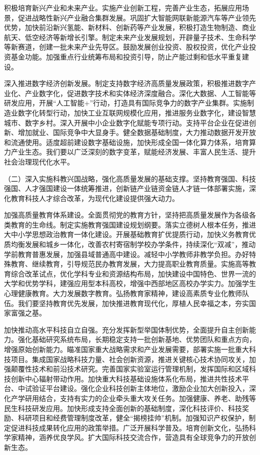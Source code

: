 \documentclass[10pt, UTF8]{ctexbook} %
\begin{document}
积极培育新兴产业和未来产业。实施产业创新工程，完善产业生态，拓展应用场景，促进战略性新兴产业融合集群发展。巩固扩大智能网联新能源汽车等产业领先优势，加快前沿新兴氢能、新材料、创新药等产业发展，积极打造生物制造、商业航天、低空经济等新增长引擎。制定未来产业发展规划，开辟量子技术、生命科学等新赛道，创建一批未来产业先导区。鼓励发展创业投资、股权投资，优化产业投资基金功能。加强重点行业统筹布局和投资引导，防止产能过剩和低水平重复建设。

深入推进数字经济创新发展。制定支持数字经济高质量发展政策，积极推进数字产业化、产业数字化，促进数字技术和实体经济深度融合。深化大数据、人工智能等研发应用，开展“人工智能+”行动，打造具有国际竞争力的数字产业集群。实施制造业数字化转型行动，加快工业互联网规模化应用，推进服务业数字化，建设智慧城市、数字乡村。深入开展中小企业数字化赋能专项行动。支持平台企业在促进创新、增加就业、国际竞争中大显身手。健全数据基础制度，大力推动数据开发开放和流通使用。适度超前建设数字基础设施，加快形成全国一体化算力体系，培育算力产业生态。我们要以广泛深刻的数字变革，赋能经济发展、丰富人民生活、提升社会治理现代化水平。

（二）深入实施科教兴国战略，强化高质量发展的基础支撑。坚持教育强国、科技强国、人才强国建设一体统筹推进，创新链产业链资金链人才链一体部署实施，深化教育科技人才综合改革，为现代化建设提供强大动力。

加强高质量教育体系建设。全面贯彻党的教育方针，坚持把高质量发展作为各级各类教育的生命线。制定实施教育强国建设规划纲要。落实立德树人根本任务，推进大中小学思想政治教育一体化建设。开展基础教育扩优提质行动，加快义务教育优质均衡发展和城乡一体化，改善农村寄宿制学校办学条件，持续深化“双减”，推动学前教育普惠发展，加强县域普通高中建设。减轻中小学教师非教学负担。办好特殊教育、继续教育，引导规范民办教育发展，大力提高职业教育质量。实施高等教育综合改革试点，优化学科专业和资源结构布局，加快建设中国特色、世界一流的大学和优势学科，建强应用型本科高校，增强中西部地区高校办学实力。加强学生心理健康教育。大力发展数字教育。弘扬教育家精神，建设高素质专业化教师队伍。我们要坚持教育优先发展，加快推进教育现代化，厚植人民幸福之本，夯实国家富强之基。

加快推动高水平科技自立自强。充分发挥新型举国体制优势，全面提升自主创新能力。强化基础研究系统布局，长期稳定支持一批创新基地、优势团队和重点方向，增强原始创新能力。瞄准国家重大战略需求和产业发展需要，部署实施一批重大科技项目。集成国家战略科技力量、社会创新资源，推进关键核心技术协同攻关，加强颠覆性技术和前沿技术研究。完善国家实验室运行管理机制，发挥国际和区域科技创新中心辐射带动作用。加快重大科技基础设施体系化布局，推进共性技术平台、中试验证平台建设。强化企业科技创新主体地位，激励企业加大创新投入，深化产学研用结合，支持有实力的企业牵头重大攻关任务。加强健康、养老、助残等民生科技研发应用。加快形成支持全面创新的基础制度，深化科技评价、科技奖励、科研项目和经费管理制度改革，健全“揭榜挂帅”机制。加强知识产权保护，制定促进科技成果转化应用的政策举措。广泛开展科学普及。培育创新文化，弘扬科学家精神，涵养优良学风。扩大国际科技交流合作，营造具有全球竞争力的开放创新生态。
\end{document}
